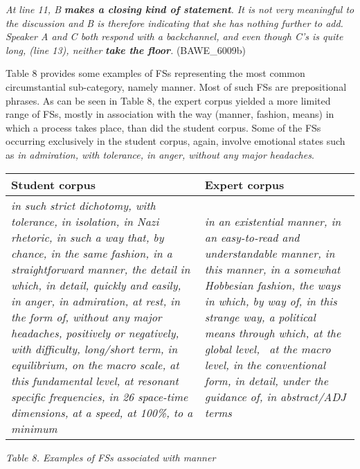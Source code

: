 \begin{listWWNumxxixleveli}
\item 
\begin{styleListParagraph}
\textit{At line 11, B }\textbf{\textit{makes a closing kind of statement}}\textit{. It is not very meaningful to the discussion and B is therefore indicating that she has nothing further to add. Speaker A and C both respond with a backchannel, and even though C’s is quite long, (line 13), neither }\textbf{\textit{take the floor}}\textit{.} (BAWE\_6009b)
\end{styleListParagraph}
\end{listWWNumxxixleveli}
\begin{styleStandard}
Table 8 provides some examples of FSs representing the most common circumstantial sub-category, namely manner. Most of such FSs are prepositional phrases. As can be seen in Table 8, the expert corpus yielded a more limited range of FSs, mostly in association with the way (manner, fashion, means) in which a process takes place, than did the student corpus. Some of the FSs occurring exclusively in the student corpus, again, involve emotional states such as \textit{in admiration, with tolerance, in anger, without any major headaches}. 
\end{styleStandard}

\begin{flushleft}
\tablefirsthead{}
\tablehead{}
\tabletail{}
\tablelasttail{}
\begin{supertabular}{m{2.27756in}m{2.2844598in}}
\hline
Student corpus &
Expert corpus\\\hline
\textit{in such strict dichotomy, with tolerance, in isolation, in Nazi rhetoric, in such a way that, by chance, in the same fashion, in a straightforward manner, the detail in which, in detail, quickly and easily, in anger, in admiration, at rest, in the form of, without any major headaches, positively or negatively, with difficulty, long/short term, in equilibrium, on the macro scale, at this fundamental level, at resonant specific frequencies, in 26 space-time dimensions, at a speed, at 100\%, to a minimum} &
\textit{in an existential manner, in an easy-to-read and understandable manner, in this manner, in a somewhat Hobbesian fashion, the ways in which, by way of, in this strange way, a political means through which, at the global level, \ at the macro level, in the conventional form, in detail, under the guidance of, in abstract/ADJ terms}\\\hline
\end{supertabular}
\end{flushleft}
\begin{styleStandard}
\textit{Table 8. Examples of FSs associated with manner}
\end{styleStandard}

